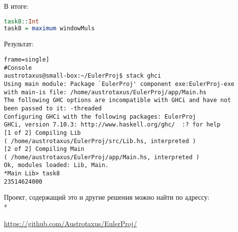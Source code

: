\documentclass[11pt,a4paper]{article}
\begin{document}
В итоге: 
\begin{lstlisting}[language=Haskell, frame=single]
task8::Int
task8 = maximum windowMuls


\end{lstlisting}

Результат:
\begin{lstlisting}frame=single]
#Console
austrotaxus@small-box:~/EulerProj$ stack ghci
Using main module: Package `EulerProj' component exe:EulerProj-exe
with main-is file: /home/austrotaxus/EulerProj/app/Main.hs
The following GHC options are incompatible with GHCi and have not
been passed to it: -threaded
Configuring GHCi with the following packages: EulerProj
GHCi, version 7.10.3: http://www.haskell.org/ghc/  :? for help
[1 of 2] Compiling Lib
( /home/austrotaxus/EulerProj/src/Lib.hs, interpreted )
[2 of 2] Compiling Main
( /home/austrotaxus/EulerProj/app/Main.hs, interpreted )
Ok, modules loaded: Lib, Main. 
*Main Lib> task8
23514624000
\end{lstlisting}


Проект, содержащий это и другие решения можно найти по адрессу:\\*

\url{https://github.com/Austrotaxus/EulerProj/}
\end{document}

